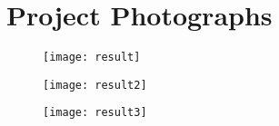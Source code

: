 \newpage
\chapter{Project Photographs }

\begin{figure}[h!]
    \begin{center}
        \texttt{[image: result]}
    \end{center}
\end{figure}

\begin{figure}[h!]
    \begin{center}
        \texttt{[image: result2]}
    \end{center}
\end{figure}

\begin{figure}[h!]
    \begin{center}
        \texttt{[image: result3]}
    \end{center}
\end{figure}